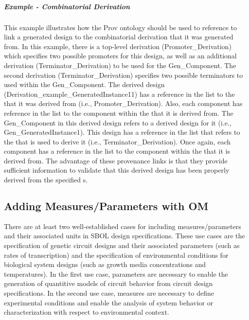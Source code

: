 \clearpage

\subparagraph{Example - Combinatorial Derivation}
This example illustrates how the Prov ontology should be used to reference to link a generated design to the combinatorial derivation that it was generated from.  In this example, there is a top-level derivation (Promoter\_Derivation) which specifies two possible promoters for this design, as well as an additional derivation (Terminator\_Derivation) to be used for the Gen\_Component.  The second derivation (Terminator\_Derivation) specifies two possible terminators to used within the Gen\_Component.  The derived design (Derivation\_example\_GeneratedInstance11) has a reference in the  list to the  that it was derived from (i.e., Promoter\_Derivation).  Also, each component has reference in the  list to the component within the  that it is derived from.  The Gen\_Component in this derived design refers to a derived design for it (i.e., Gen\_GeneratedInstance1).  This design has a reference in the  list that refers to the  that is used to derive it (i.e., Terminator\_Derivation).  Once again, each component has a reference in the  list to the component within the  that it is derived from.  The advantage of these provenance links is that they provide sufficient information to validate that this derived design has been properly derived from the specified s.

\subsection{Adding Measures/Parameters with OM}
\label{sec:parameters}

There are at least two well-established cases for including measures/parameters and their associated units in SBOL design specifications. These use cases are the specification of genetic circuit designs and their associated parameters (such as rates of transcription) and the specification of environmental conditions for biological system designs (such as growth media concentrations and temperatures). In the first use case, parameters are necessary to enable the generation of quantitive models of circuit behavior from circuit design specifications. In the second use case, measures are necessary to define experimental conditions and enable the analysis of system behavior or characterization with respect to environmental context.

